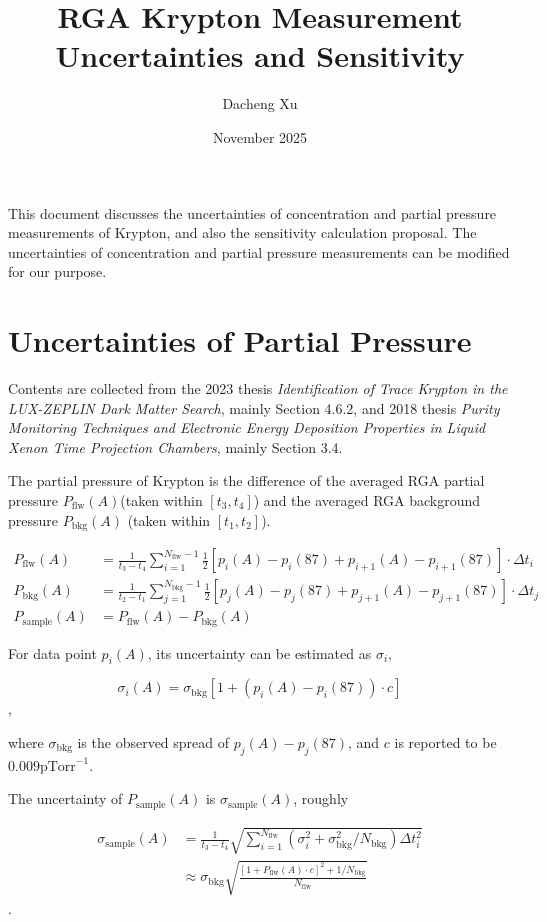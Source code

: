\documentclass{article}
\title{RGA Krypton Measurement Uncertainties and Sensitivity}
\author{Dacheng Xu}
\date{November 2025}
\begin{document}
\maketitle

This document discusses the uncertainties of concentration and partial pressure measurements of Krypton, and also the sensitivity calculation proposal. The uncertainties of concentration and partial pressure measurements can be modified for our purpose.

\section{Uncertainties of Partial Pressure}

Contents are collected from the 2023 thesis \textit{Identification of Trace Krypton in the LUX-ZEPLIN Dark Matter Search}, mainly Section 4.6.2, and 2018 thesis \textit{Purity Monitoring Techniques and Electronic Energy Deposition Properties in Liquid Xenon Time Projection Chambers}, mainly Section 3.4.

The partial pressure of Krypton is the difference of the averaged RGA partial pressure $P_\mathrm{flw}(A)$(taken within $[t_3, t_4]$) and the averaged RGA background pressure $P_\mathrm{bkg}(A)$ (taken within $[t_1, t_2]$).

\begin{align}
    P_\mathrm{flw}(A) &= \frac{1}{t_3 - t_4}\sum_{i = 1}^{N_\mathrm{flw} - 1} \frac{1}{2} [p_i(A) - p_i(87) + p_{i+1}(A) - p_{i+1}(87)]\cdot \Delta t_i \\
    P_\mathrm{bkg}(A) &= \frac{1}{t_2 - t_1}\sum_{j = 1}^{N_\mathrm{bkg} - 1} \frac{1}{2} [p_j(A) - p_j(87) + p_{j+1}(A) - p_{j+1}(87)]\cdot \Delta t_j \\
    P_\mathrm{sample}(A) &= P_\mathrm{flw}(A) - P_\mathrm{bkg}(A)
\end{align}

For data point $p_i(A)$, its uncertainty can be estimated as $\sigma_i$,

\begin{equation}
    \sigma_i(A) = \sigma_\mathrm{bkg} [1 + (p_i(A) - p_i(87)) \cdot c]
\end{equation},

where $\sigma_\mathrm{bkg}$ is the observed spread of $p_j(A) - p_j(87)$, and $c$ is reported to be $0.009 \mathrm{pTorr}^{-1}$.

The uncertainty of $P_\mathrm{sample}(A)$ is $\sigma_\mathrm{sample}(A)$, roughly

\begin{align}
    \sigma_\mathrm{sample}(A) &= \frac{1}{t_3 - t_4}\sqrt{\sum_{i = 1}^{N_\mathrm{flw}}(\sigma_i^2 + \sigma_\mathrm{bkg}^2 / N_\mathrm{bkg})\Delta t_i^2} \\
    &\approx \sigma_\mathrm{bkg}\sqrt{\frac{[1 +  P_\mathrm{flw}(A) \cdot c]^2 + 1 / N_\mathrm{bkg}}{N_\mathrm{flw}}}
\end{align}.
\end{document}

